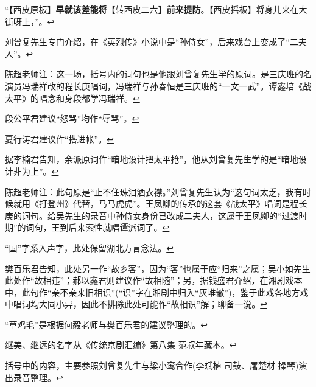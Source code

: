   ``【西皮原板】\textbf{早就该差能将}【转西皮二六】\textbf{前来提防}。【西皮摇板】将身儿来在大街呀上，''。\protect\hyperlink{fnref553}{↩}
\item
  \leavevmode\hypertarget{fn554}{}%
  刘曾复先生专门介绍，在《英烈传》小说中是``孙侍女''，后来戏台上变成了``二夫人''。\protect\hyperlink{fnref554}{↩}
\item
  \leavevmode\hypertarget{fn555}{}%
  陈超老师注：这一场，括号内的词句也是他跟刘曾复先生学的原词。是三庆班的名演员冯瑞祥改的程长庚唱词，冯瑞祥与孙春恒是三庆班的``一文一武''。谭鑫培《战太平》的唱念和身段都学冯瑞祥。\protect\hyperlink{fnref555}{↩}
\item
  \leavevmode\hypertarget{fn556}{}%
  段公平君建议``怒骂''均作``辱骂''。\protect\hyperlink{fnref556}{↩}
\item
  \leavevmode\hypertarget{fn557}{}%
  夏行涛君建议作``搭进帐''。\protect\hyperlink{fnref557}{↩}
\item
  \leavevmode\hypertarget{fn558}{}%
  据李楠君告知，余派原词作``暗地设计把太平抢''，他从刘曾复先生学的是``暗地设计非为上''。\protect\hyperlink{fnref558}{↩}
\item
  \leavevmode\hypertarget{fn559}{}%
  陈超老师注：此句原是``止不住珠泪洒衣襟。''刘曾复先生认为``这句词太乏，我有时候就用《打登州》代替，马马虎虎''。王凤卿的传承的这套《战太平》唱词是程长庚的词句。给吴先生的录音中孙侍女身份已改成二夫人，这属于王凤卿的``过渡时期''的词句，王到后来索性就唱谭派词了。\protect\hyperlink{fnref559}{↩}
\item
  \leavevmode\hypertarget{fn560}{}%
  ``国''字系入声字，此处保留湖北方言念法。\protect\hyperlink{fnref560}{↩}
\item
  \leavevmode\hypertarget{fn561}{}%
  樊百乐君告知，此处另一作``故乡客''，因为``客''也属于应``归来''之属；吴小如先生此处作``故相违''；郝以鑫君则建议作``故相随''；另，据钱盛君介绍，在湘剧戏本中，此句作``亲不亲来旧相识''(``识''字在湘剧中归入``灰堆辙'')，鉴于此戏各地方戏中唱词均大同小异，因此不排除此处可能作``故相识''解；聊备一说。\protect\hyperlink{fnref561}{↩}
\item
  \leavevmode\hypertarget{fn562}{}%
  ``草鸡毛''是根据何毅老师与樊百乐君的建议整理的。\protect\hyperlink{fnref562}{↩}
\item
  \leavevmode\hypertarget{fn563}{}%
  继美、继远的名字从《传统京剧汇编》第八集
  范叔年藏本。\protect\hyperlink{fnref563}{↩}
\item
  \leavevmode\hypertarget{fn564}{}%
  括号中的内容，主要参照刘曾复先生与梁小鸾合作(李斌植 司鼓、屠楚材
  操琴)演出录音整理。\protect\hyperlink{fnref564}{↩}
\item
